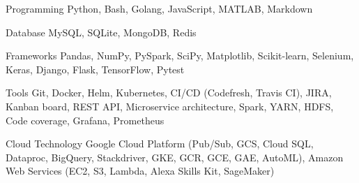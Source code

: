 

\begin{cvskills}

  \cvskill
    {Programming} %
    {Python, Bash, Golang, JavaScript, MATLAB, Markdown} %

  \cvskill
    {Database} %
    {MySQL, SQLite, MongoDB, Redis} %


  \cvskill
    {Frameworks} %
    {Pandas, NumPy, PySpark, SciPy, Matplotlib, Scikit-learn, Selenium, Keras, Django, Flask, TensorFlow, Pytest} %



  \cvskill
    {Tools} %
    {Git, Docker, Helm, Kubernetes,  CI/CD (Codefresh, Travis CI), JIRA, Kanban board, REST API, Microservice architecture, Spark, YARN, HDFS, Code coverage, Grafana, Prometheus} %

  \cvskill
    {Cloud Technology} %
    {Google Cloud Platform (Pub/Sub, GCS, Cloud SQL, Dataproc, BigQuery, Stackdriver, GKE, GCR, GCE, GAE, AutoML), Amazon Web Services (EC2, S3, Lambda, Alexa Skills Kit, SageMaker)} 

    

\end{cvskills}
